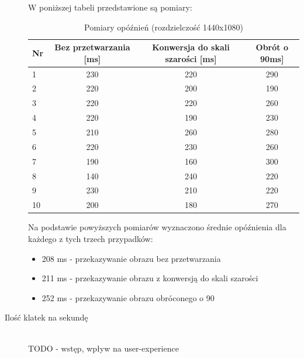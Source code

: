\documentclass[a4paper,11pt,twoside]{report}
\theoremstyle{definition}
\begin{document}
\begin{description}
W poniższej tabeli przedstawione są pomiary:
\begin{table}[H]
\centering
\begin{tabular}{lccc}
Nr & Bez przetwarzania {[}ms{]} & Konwersja do skali szarości {[}ms{]} & Obrót o 90\textdegree {[}ms{]} \\ \hline
1  & 230                        & 220                                  & 290                            \\
2  & 220                        & 200                                  & 190                            \\
3  & 220                        & 220                                  & 260                            \\
4  & 220                        & 190                                  & 230                            \\
5  & 210                        & 260                                  & 280                            \\
6  & 220                        & 230                                  & 260                            \\
7  & 190                        & 160                                  & 300                            \\
8  & 140                        & 240                                  & 220                            \\
9  & 230                        & 210                                  & 220                            \\
10 & 200                        & 180                                  & 270                            
\end{tabular}
\caption{Pomiary opóźnień (rozdzielczość 1440x1080)}
\end{table}

Na podstawie powyższych pomiarów wyznaczono średnie opóźnienia dla każdego z tych trzech przypadków:

\begin{itemize}
\item 208 ms - przekazywanie obrazu bez przetwarzania 
\item 211 ms - przekazywanie obrazu z konwersją do skali szarości
\item 252 ms - przekazywanie obrazu obróconego o 90\textdegree
\end{itemize}


\item[Ilość klatek na sekundę] \hfill \\
TODO - wstęp, wpływ na user-experience


\end{description}
\end{document}
